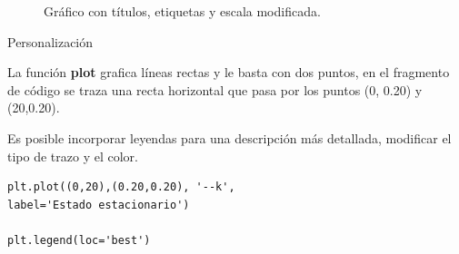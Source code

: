 \documentclass[10pt]{beamer}
\begin{document}
\begin{frame}
	\begin{figure}
		\caption{Gráfico con títulos, etiquetas y escala modificada.}
	\end{figure}
\end{frame}

\begin{frame}[fragile]{Personalización}

La función \textbf{plot} grafica líneas rectas y le basta con dos puntos, en el fragmento de código se traza una recta horizontal que pasa por los puntos (0, 0.20) y (20,0.20).
\vspace{1em}

Es posible incorporar leyendas para una descripción más detallada, modificar el tipo de trazo y el color.

	\begin{verbatim}
plt.plot((0,20),(0.20,0.20), '--k', 
label='Estado estacionario')

plt.legend(loc='best')
	\end{verbatim}
\end{frame}
\end{document}
